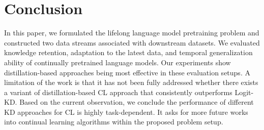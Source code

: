 \section{Conclusion}
\vspace{-0.1cm}
In this paper, we formulated the lifelong language model pretraining problem and constructed two data streams associated with downstream datasets. 
We evaluated knowledge retention, adaptation to the latest data, and temporal generalization ability of continually pretrained language models. 
Our experiments show distillation-based approaches being most effective in these evaluation setups. A limitation of the work is that it has not been fully addressed whether there exists a variant of distillation-based CL approach that consistently outperforms Logit-KD. Based on the current observation, we conclude the performance of different KD approaches for CL is highly task-dependent.
It asks for more future works into continual learning algorithms within the proposed problem setup.



